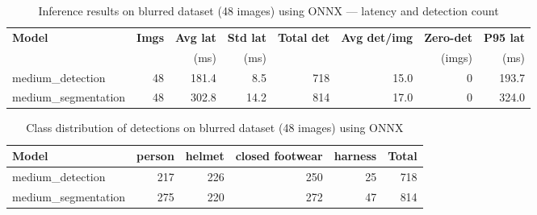 \begin{table}[H]
\centering
\begin{tabular}{lrrrrrrr}
\toprule
\textbf{Model} & \textbf{Imgs} & \textbf{Avg lat} & \textbf{Std lat} & \textbf{Total det} & \textbf{Avg det/img} & \textbf{Zero-det} & \textbf{P95 lat} \\
 &  & (ms) & (ms) &  &  & (imgs) & (ms) \\
\midrule
medium_detection & 48 & 181.4 & 8.5 & 718 & 15.0 & 0 & 193.7 \\
medium_segmentation & 48 & 302.8 & 14.2 & 814 & 17.0 & 0 & 324.0 \\
\bottomrule
\end{tabular}
\caption{Inference results on blurred dataset (48 images) using ONNX — latency and detection count}
\label{tab:blurred_onnx_results}
\end{table}

\begin{table}[H]
\centering
\begin{tabular}{lrrrrr}
\toprule
\textbf{Model} & \textbf{person} & \textbf{helmet} & \textbf{closed footwear} & \textbf{harness} & \textbf{Total} \\
\midrule
medium_detection & 217 & 226 & 250 & 25 & 718 \\
medium_segmentation & 275 & 220 & 272 & 47 & 814 \\
\bottomrule
\end{tabular}
\caption{Class distribution of detections on blurred dataset (48 images) using ONNX}
\label{tab:blurred_class_dist}
\end{table}